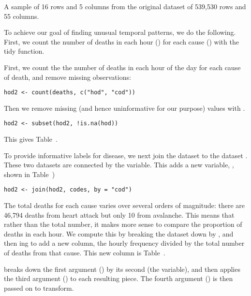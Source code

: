\documentclass[article]{jss}
\begin{document}
\begin{table}
  \centering
  
  \caption{A sample of 16 rows and 5 columns from the original dataset of 539,530 rows and 55 columns.}
  \label{fig:raw}
\end{table}

To achieve our goal of finding unusual temporal patterns, we do the following. First, we count the number of deaths in each hour () for each cause () with the tidy  function. 

First, we count the the number of deaths in each hour of the day for each cause of death, and remove missing observations:

\begin{Verbatim}
hod2 <- count(deaths, c("hod", "cod"))
\end{Verbatim}

Then we remove missing (and hence uninformative for our purpose) values with . 

\begin{Verbatim}
hod2 <- subset(hod2, !is.na(hod))
\end{Verbatim}

This gives Table~.

To provide informative labels for disease, we next join the dataset to the  dataset . These two datasets are connected by the  variable. This adds a new variable, , shown in Table~)

\begin{Verbatim}
hod2 <- join(hod2, codes, by = "cod")
\end{Verbatim}

The total deaths for each cause varies over several orders of magnitude: there are 46,794 deaths from heart attack but only 10 from avalanche. This means that rather than the total number, it makes more sense to compare the proportion of deaths in each hour. We compute this by breaking the dataset down by , and then ing to add a new  column, the hourly frequency divided by the total number of deaths from that cause. This new column is Table~.

 breaks down the first argument () by its second (the  variable), and then applies the third argument () to each resulting piece. The fourth argument () is then passed on to transform.
\end{document}
